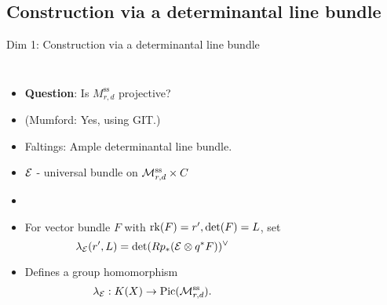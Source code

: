 \documentclass[8pt,handout]{beamer} %
\begin{document}
\subsection{Construction via a determinantal line bundle}
\begin{frame}[fragile]{Dim 1: Construction via a determinantal line bundle}
\pause
\begin{columns}[t]
    \begin{itemize}
        \item[]<1-> \textbf{Question}: Is $M^{\text{ss}}_{r,d}$ projective?
        \item[]<2-> {\footnotesize (Mumford: Yes, using GIT.)}
        \item<3-> Faltings: Ample determinantal line bundle.
        \item<4-> $\mathcal{E}$ - universal bundle on $\mathcal{M}^{\text{ss}}_{r,d} \times C$
        \item[]<5->
        \begin{center}
        \end{center}
        \item<5-> For vector bundle $F$ with $\operatorname{\mathrm{rk}}(F) = r', \det(F) = L$, set
        \[ \lambda_{\mathcal{E}}(r', L) = \det(R p_* (\mathcal{E} \otimes q^*F))^\vee \]
        \item<6-> Defines a group homomorphism
        \[ \lambda_{\mathcal{E}}: K(X) \to \mathrm{Pic}(\mathcal{M}^{\text{ss}}_{r,d}). \]
    \end{itemize}
    \pause
    

\end{columns}
\end{frame}
\end{document}
